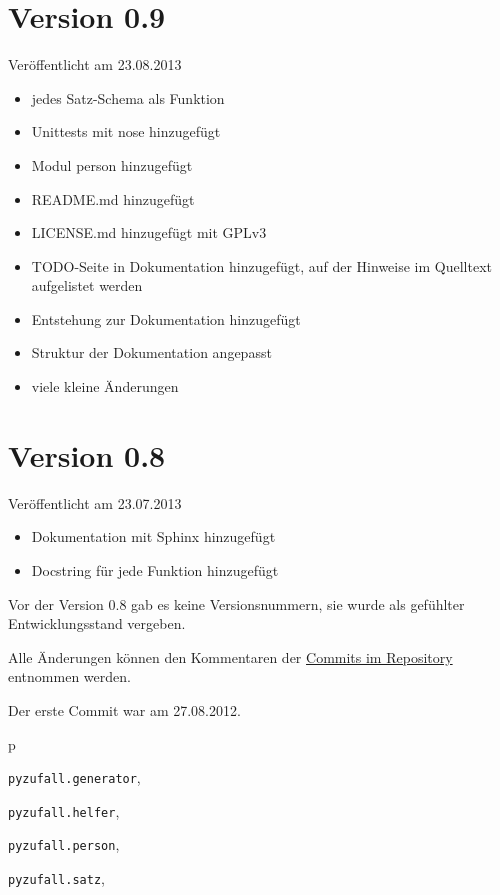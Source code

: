 \documentclass[a4paper,12pt,oneside]{sphinxmanual}
\begin{document}
\section{Version 0.9}
\label{changelog:version-0-9}
Veröffentlicht am 23.08.2013
\begin{itemize}
\item {} 
jedes Satz-Schema als Funktion

\item {} 
Unittests mit nose hinzugefügt

\item {} 
Modul person hinzugefügt

\item {} 
README.md hinzugefügt

\item {} 
LICENSE.md hinzugefügt mit GPLv3

\item {} 
TODO-Seite in Dokumentation hinzugefügt, auf der Hinweise im Quelltext aufgelistet werden

\item {} 
Entstehung zur Dokumentation hinzugefügt

\item {} 
Struktur der Dokumentation angepasst

\item {} 
viele kleine Änderungen

\end{itemize}


\section{Version 0.8}
\label{changelog:version-0-8}
Veröffentlicht am 23.07.2013
\begin{itemize}
\item {} 
Dokumentation mit Sphinx hinzugefügt

\item {} 
Docstring für jede Funktion hinzugefügt

\end{itemize}

Vor der Version 0.8 gab es keine Versionsnummern, sie wurde als gefühlter Entwicklungsstand vergeben.

Alle Änderungen können den Kommentaren der \href{https://github.com/davidak/pyzufall/commits/}{Commits im Repository} entnommen werden.

Der erste Commit war am 27.08.2012.


\renewcommand{\indexname}{Python-Modulindex}
\begin{theindex}
\def\bigletter#1{{\Large\sffamily#1}\nopagebreak\vspace{1mm}}
\bigletter{p}
\item {\texttt{pyzufall.generator}}, \pageref{module:module-pyzufall.generator}
\item {\texttt{pyzufall.helfer}}, \pageref{module:module-pyzufall.helfer}
\item {\texttt{pyzufall.person}}, \pageref{module:module-pyzufall.person}
\item {\texttt{pyzufall.satz}}, \pageref{module:module-pyzufall.satz}
\end{theindex}

\renewcommand{\indexname}{Stichwortverzeichnis}
\printindex
\end{document}
